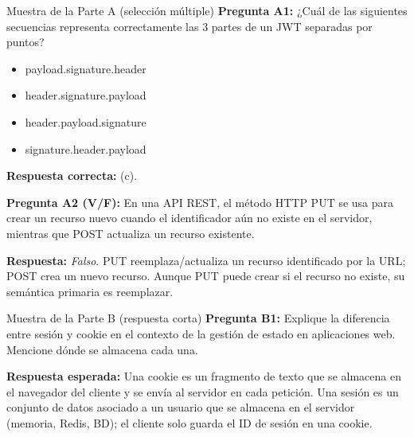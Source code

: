 \begin{cajaejemplo}{Muestra de la Parte A (selección múltiple)}
\textbf{Pregunta A1:} ¿Cuál de las siguientes secuencias representa
correctamente las 3 partes de un JWT separadas por puntos?
\begin{itemize}
\item[a)] payload.signature.header
\item[b)] header.signature.payload
\item[c)] header.payload.signature
\item[d)] signature.header.payload
\end{itemize}
\textbf{Respuesta correcta:} (c).

\textbf{Pregunta A2 (V/F):} En una API REST, el método HTTP PUT se
usa para crear un recurso nuevo cuando el identificador aún no existe
en el servidor, mientras que POST actualiza un recurso existente.

\textbf{Respuesta:} \emph{Falso}. PUT reemplaza/actualiza un recurso
identificado por la URL; POST crea un nuevo recurso. Aunque PUT puede
crear si el recurso no existe, su semántica primaria es reemplazar.
\end{cajaejemplo}

\begin{cajaejemplo}{Muestra de la Parte B (respuesta corta)}
\textbf{Pregunta B1:} Explique la diferencia entre sesión y cookie en
el contexto de la gestión de estado en aplicaciones web. Mencione
dónde se almacena cada una.

\textbf{Respuesta esperada:} Una cookie es un fragmento de texto que
se almacena en el navegador del cliente y se envía al servidor en
cada petición. Una sesión es un conjunto de datos asociado a un
usuario que se almacena en el servidor (memoria, Redis, BD); el
cliente solo guarda el ID de sesión en una cookie.
\end{cajaejemplo}

